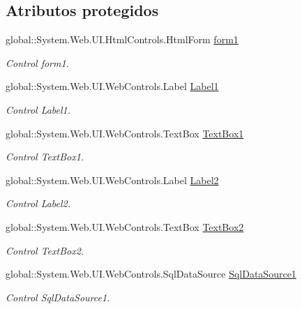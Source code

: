 \subsection*{Atributos protegidos}
\begin{DoxyCompactItemize}
\item 
global\+::\+System.\+Web.\+U\+I.\+Html\+Controls.\+Html\+Form \mbox{\hyperlink{classInicio_1_1Profesor_1_1InsertarTarea_aebf7c8c1c98ab0bbc64bb07e70ebcd4e}{form1}}
\begin{DoxyCompactList}\small\item\em Control form1. \end{DoxyCompactList}\item 
global\+::\+System.\+Web.\+U\+I.\+Web\+Controls.\+Label \mbox{\hyperlink{classInicio_1_1Profesor_1_1InsertarTarea_a7d69f2949d25d39cbad11ad28497b5f1}{Label1}}
\begin{DoxyCompactList}\small\item\em Control Label1. \end{DoxyCompactList}\item 
global\+::\+System.\+Web.\+U\+I.\+Web\+Controls.\+Text\+Box \mbox{\hyperlink{classInicio_1_1Profesor_1_1InsertarTarea_a606f1270a89d222d8a929f5ddae79988}{Text\+Box1}}
\begin{DoxyCompactList}\small\item\em Control Text\+Box1. \end{DoxyCompactList}\item 
global\+::\+System.\+Web.\+U\+I.\+Web\+Controls.\+Label \mbox{\hyperlink{classInicio_1_1Profesor_1_1InsertarTarea_ac457501cc0a165ec67a5474e2581a8b5}{Label2}}
\begin{DoxyCompactList}\small\item\em Control Label2. \end{DoxyCompactList}\item 
global\+::\+System.\+Web.\+U\+I.\+Web\+Controls.\+Text\+Box \mbox{\hyperlink{classInicio_1_1Profesor_1_1InsertarTarea_a55b3f89405ded6d43d46e28dfbec3326}{Text\+Box2}}
\begin{DoxyCompactList}\small\item\em Control Text\+Box2. \end{DoxyCompactList}\item 
global\+::\+System.\+Web.\+U\+I.\+Web\+Controls.\+Sql\+Data\+Source \mbox{\hyperlink{classInicio_1_1Profesor_1_1InsertarTarea_a06e7fe0568bd32669aa769adced07cb4}{Sql\+Data\+Source1}}
\begin{DoxyCompactList}\small\item\em Control Sql\+Data\+Source1. \end{DoxyCompactList}\item 

\end{DoxyCompactItemize}

